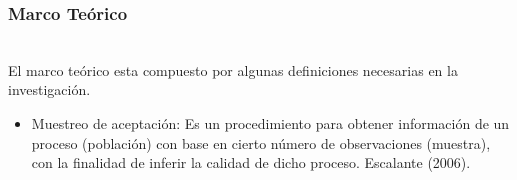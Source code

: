 \documentclass[11pt]{beamer}
\begin{document}
\begin{frame}
\frametitle{Marco Teórico}
~\\El marco teórico esta compuesto por algunas definiciones necesarias en la investigación.
\begin{itemize}
\item Muestreo de aceptación: Es un procedimiento para obtener información de un proceso (población) con base en cierto número de observaciones (muestra), con la finalidad de inferir la calidad de dicho proceso. Escalante (2006).
\end{itemize}
\end{frame}
\end{document}
